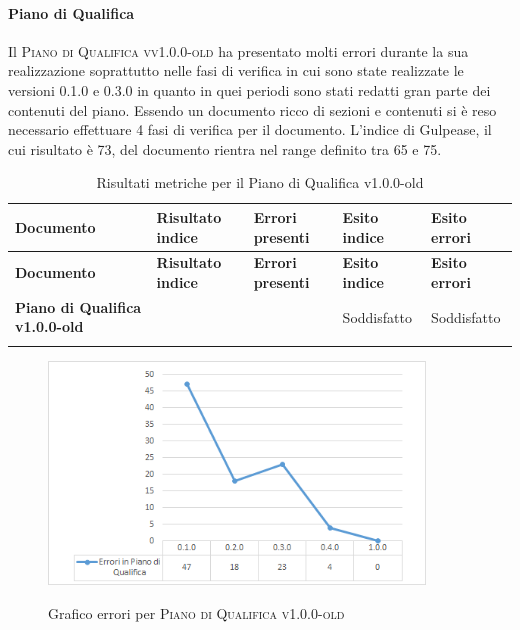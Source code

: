 \documentclass[../piano-di-qualifica.tex]{subfiles}
\begin{document}
\paragraph{Piano di Qualifica}
\label{sub:piano_di_qualifica}
Il \textsc{Piano di Qualifica vv1.0.0-old} ha presentato molti errori durante la sua realizzazione soprattutto nelle fasi di verifica in cui sono state realizzate le versioni 0.1.0 e 0.3.0 in quanto in quei periodi sono stati redatti gran parte dei contenuti del piano.
Essendo un documento ricco di sezioni e contenuti si è reso necessario effettuare 4 fasi di verifica per il documento.
L'indice di Gulpease, il cui risultato è 73, del documento rientra nel range definito tra 65 e 75.

\renewcommand{\arraystretch}{2} %
\begin{longtable}[H]{>{\centering\bfseries}m{6cm} >{\centering}m{2cm} >{\centering}m{2.5cm} >{\centering}m{2.5cm} >{\centering\arraybackslash}m{2.5cm}}  
  \rowcolor{lightgray}
  {\textbf{Documento}} & {\textbf{Risultato indice}} & {\textbf{Errori presenti}} & {\textbf{Esito indice}} & {\textbf{Esito errori}}  \\
  \endfirsthead%
  \rowcolor{lightgray}
  {\textbf{Documento}} & {\textbf{Risultato indice}} & {\textbf{Errori presenti}} & {\textbf{Esito indice}} & {\textbf{Esito errori}}  \\
  \endhead%
  \textbf{Piano di Qualifica v1.0.0-old} &  73               & 0               & Soddisfatto & Soddisfatto \\
  \caption{Risultati metriche per il Piano di Qualifica v1.0.0-old}
  \label{tab:my-table}
\end{longtable}

\begin{figure}[H]
    \centering
    \includegraphics[width=10cm]{img/erroriPdQ.png}
    \label{fig:scice_documenti}
    \caption{Grafico errori per \textsc{Piano di Qualifica v1.0.0-old}}
\end{figure}
\end{document}
